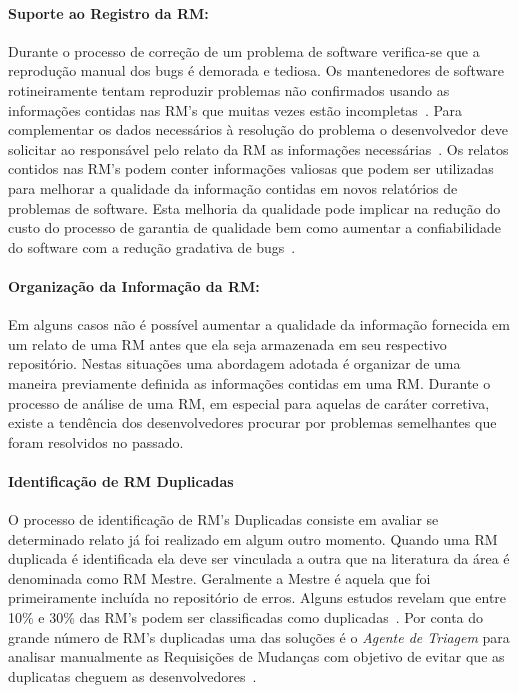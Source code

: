 \paragraph{Suporte ao Registro da RM:} Durante o processo de correção de um
problema de software verifica-se que a reprodução manual dos bugs é demorada e
tediosa. Os mantenedores de software rotineiramente tentam reproduzir problemas
não confirmados usando as informações contidas nas RM's que muitas vezes estão
incompletas~\cite{White:2015:GRR:2820282.2820291}. Para complementar os dados
necessários à resolução do problema o desenvolvedor deve solicitar ao
responsável pelo relato da RM as informações necessárias~\cite{5070993}. Os
relatos contidos nas RM's podem conter informações valiosas que podem ser
utilizadas para melhorar a qualidade da informação contidas em novos relatórios
de problemas de software. Esta melhoria da qualidade pode implicar na redução do
custo do processo de garantia de qualidade bem como aumentar a confiabilidade do
software com a redução gradativa de bugs~\cite{Tu:2014:MQI:2677832.2677844}.

\paragraph{Organização da Informação da RM:} Em alguns casos não é possível
aumentar a qualidade da informação fornecida em um relato de uma RM antes que
ela seja armazenada em seu respectivo repositório.  Nestas situações uma
abordagem adotada é organizar de uma maneira previamente definida as informações
contidas em uma RM\@. Durante o processo de análise de uma RM, em especial para
aquelas de caráter corretiva, existe a tendência dos desenvolvedores procurar
por problemas semelhantes que foram resolvidos no passado.

\paragraph{Identificação de RM Duplicadas} O processo de identificação de RM's
Duplicadas consiste em avaliar se determinado relato já foi realizado em algum
outro momento. Quando uma RM duplicada é identificada ela deve ser vinculada a
outra que na literatura da área é denominada como RM Mestre. Geralmente a Mestre
é aquela que foi primeiramente incluída no repositório de erros. Alguns estudos
revelam que entre 10\% e 30\% das RM's podem ser classificadas como
duplicadas~\cite{anvik2005coping,cavalcanti2013bug,Runeson:2007:DDD:1248820.1248882}.
Por conta do grande número de RM's duplicadas uma das soluções é o
\textit{Agente de Triagem} para analisar manualmente as Requisições de Mudanças
com objetivo de evitar que as duplicatas cheguem as
desenvolvedores~\cite{anvik2005coping}.

